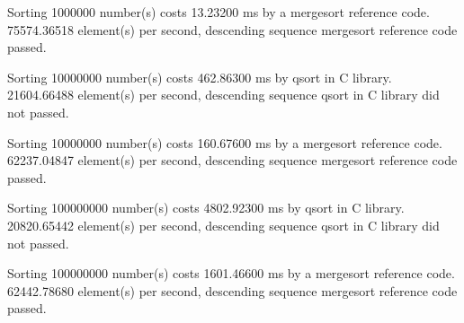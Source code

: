 \documentclass[12pt]{article}
\begin{document}
Sorting 1000000 number(s) costs 13.23200 ms by a mergesort reference code. 75574.36518 element(s) per second, descending sequence
mergesort reference code passed.

Sorting 10000000 number(s) costs 462.86300 ms by qsort in C library. 21604.66488 element(s) per second, descending sequence
qsort in C library did not passed.

Sorting 10000000 number(s) costs 160.67600 ms by a mergesort reference code. 62237.04847 element(s) per second, descending sequence
mergesort reference code passed.

Sorting 100000000 number(s) costs 4802.92300 ms by qsort in C library. 20820.65442 element(s) per second, descending sequence
qsort in C library did not passed.

Sorting 100000000 number(s) costs 1601.46600 ms by a mergesort reference code. 62442.78680 element(s) per second, descending sequence
mergesort reference code passed.
\end{document}
